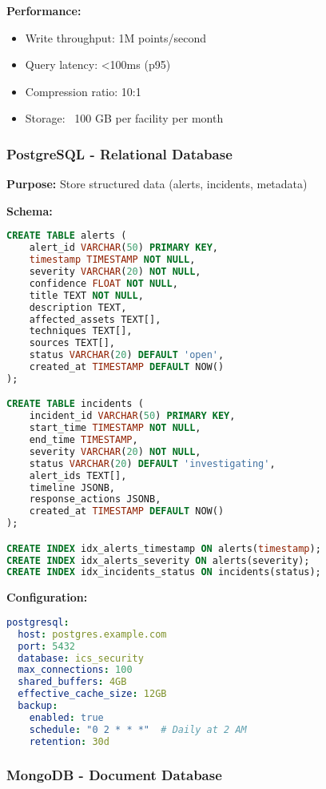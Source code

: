 \documentclass[12pt,a4paper]{article}
\begin{document}
\textbf{Performance:}
\begin{itemize}[leftmargin=1cm,itemsep=0pt]
    \item Write throughput: 1M points/second
    \item Query latency: <100ms (p95)
    \item Compression ratio: 10:1
    \item Storage: ~100 GB per facility per month
\end{itemize}

\subsubsection{PostgreSQL - Relational Database}

\textbf{Purpose:} Store structured data (alerts, incidents, metadata)

\textbf{Schema:}
\begin{lstlisting}[language=sql]
CREATE TABLE alerts (
    alert_id VARCHAR(50) PRIMARY KEY,
    timestamp TIMESTAMP NOT NULL,
    severity VARCHAR(20) NOT NULL,
    confidence FLOAT NOT NULL,
    title TEXT NOT NULL,
    description TEXT,
    affected_assets TEXT[],
    techniques TEXT[],
    sources TEXT[],
    status VARCHAR(20) DEFAULT 'open',
    created_at TIMESTAMP DEFAULT NOW()
);

CREATE TABLE incidents (
    incident_id VARCHAR(50) PRIMARY KEY,
    start_time TIMESTAMP NOT NULL,
    end_time TIMESTAMP,
    severity VARCHAR(20) NOT NULL,
    status VARCHAR(20) DEFAULT 'investigating',
    alert_ids TEXT[],
    timeline JSONB,
    response_actions JSONB,
    created_at TIMESTAMP DEFAULT NOW()
);

CREATE INDEX idx_alerts_timestamp ON alerts(timestamp);
CREATE INDEX idx_alerts_severity ON alerts(severity);
CREATE INDEX idx_incidents_status ON incidents(status);
\end{lstlisting}

\textbf{Configuration:}
\begin{lstlisting}[language=yaml]
postgresql:
  host: postgres.example.com
  port: 5432
  database: ics_security
  max_connections: 100
  shared_buffers: 4GB
  effective_cache_size: 12GB
  backup:
    enabled: true
    schedule: "0 2 * * *"  # Daily at 2 AM
    retention: 30d
\end{lstlisting}

\subsubsection{MongoDB - Document Database}
\end{document}
